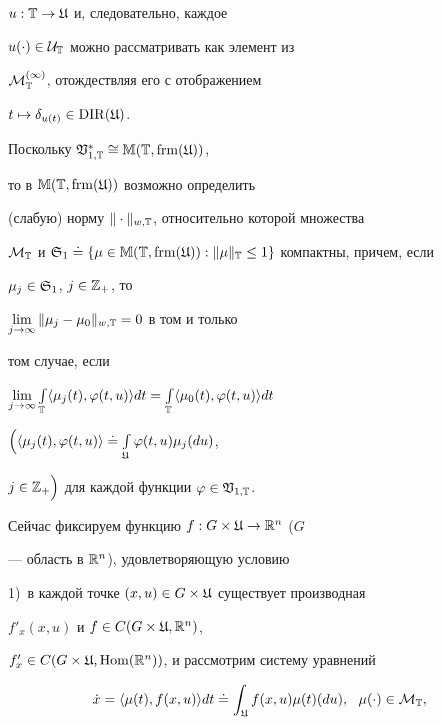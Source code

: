 $u:\Bbb T\to\frak U$ и, следовательно, каждое


$u(\cdot)\in\cal U_{\Bbb T}$ можно рассматривать как элемент из


$\cal M_{\Bbb T}^{(1)}$, отождествляя его с отображением


$t\mapsto\delta_{u(t)}\in\operatorname{DIR}(\frak U)$.


Поскольку $\frak V_{1,\Bbb T}^*\cong


\Bbb M(\Bbb T,\frm(\frak U))$,


то в $\Bbb M(\Bbb T,\operatorname{frm}(\frak U))$ возможно определить


(слабую) норму $\|\cdot\|_{w,\Bbb T}$, относительно которой множества


$\cal M_{\Bbb T}$ и $\frak S_1\doteq\{\mu\in\Bbb M


(\Bbb T,\frm(\frak U)):


\|\mu\|_{\Bbb T}\le 1\}$ компактны, причем, если


$\mu_j\in\frak S_1$, $j\in\Bbb Z_+$, то


$\lim\limits_{j\to\infty}\|\mu_j-\mu_0\|_{w,\Bbb T}=0$ в том и только


том случае, если


$\lim\limits_{j\to\infty}\int\limits_{\Bbb T}


\langle\mu_j(t),\varphi(t,u)\rangle dt=


\int\limits_{\Bbb T}\langle\mu_0(t),\varphi(t,u)\rangle dt$


$\Big(\langle\mu_j(t),\varphi(t,u)\rangle\doteq


\int\limits_{\frak U}\varphi(t,u)\mu_j(du)$,


$j\in\Bbb Z_{+}\Big)$ для каждой функции $\varphi\in\frak V_{1,\Bbb T}$.





Сейчас фиксируем функцию $f: G\times\frak U\to\Bbb R^n$ ($G$


--- область в $\Bbb R^n$), удовлетворяющую условию





1)~в каждой точке $(x,u)\in G\times\frak U$ существует производная


$f'_x(x,u)$ и $f\in C(G\times\frak U,\Bbb R^n)$,


$f'_x\in C(G\times\frak U,\operatorname{Hom}(\Bbb R^n))$, и рассмотрим систему уравнений


\begin{equation}


\Dot x=\langle\mu(t),f(x,u)\rangle dt


\doteq\int_{\frak U}f(x,u)\mu(t)(du),\ \


\mu(\cdot)\in\cal M_{\Bbb T},


\end{equation}


